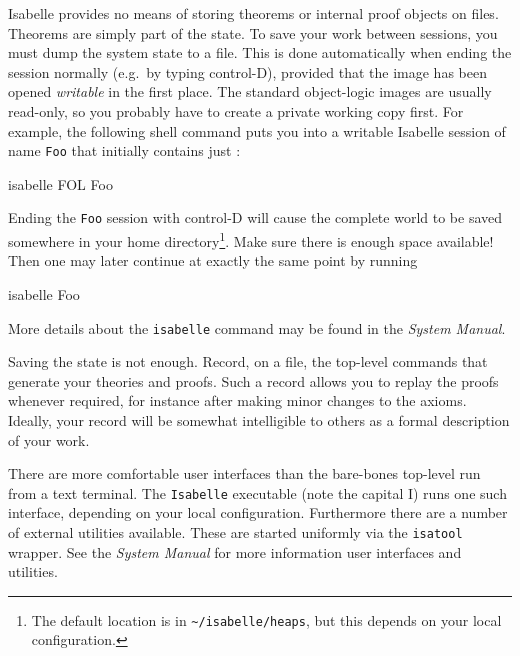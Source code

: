  Isabelle provides no means of storing
theorems or internal proof objects on files.  Theorems are simply part
of the \ML{} state.  To save your work between sessions, you must dump
the \ML{} system state to a file.  This is done automatically when
ending the session normally (e.g.\ by typing control-D), provided that
the image has been opened \emph{writable} in the first place.  The
standard object-logic images are usually read-only, so you probably
have to create a private working copy first.  For example, the
following shell command puts you into a writable Isabelle session of
name \texttt{Foo} that initially contains just \FOL:
\begin{ttbox}
isabelle FOL Foo
\end{ttbox}
Ending the \texttt{Foo} session with control-D will cause the complete
\ML{} world to be saved somewhere in your home directory\footnote{The
  default location is in \texttt{\~\relax/isabelle/heaps}, but this
  depends on your local configuration.}.  Make sure there is enough
space available! Then one may later continue at exactly the same point
by running
\begin{ttbox}
isabelle Foo  
\end{ttbox}

More details about the \texttt{isabelle} command may be found in the
\emph{System Manual}.

\medskip Saving the state is not enough.  Record, on a file, the
top-level commands that generate your theories and proofs.  Such a
record allows you to replay the proofs whenever required, for instance
after making minor changes to the axioms.  Ideally, your record will
be somewhat intelligible to others as a formal description of your
work.

\medskip There are more comfortable user interfaces than the
bare-bones \ML{} top-level run from a text terminal.  The
\texttt{Isabelle} executable (note the capital I) runs one such
interface, depending on your local configuration.  Furthermore there
are a number of external utilities available.  These are started
uniformly via the \texttt{isatool} wrapper.  See the \emph{System
  Manual} for more information user interfaces and utilities.


